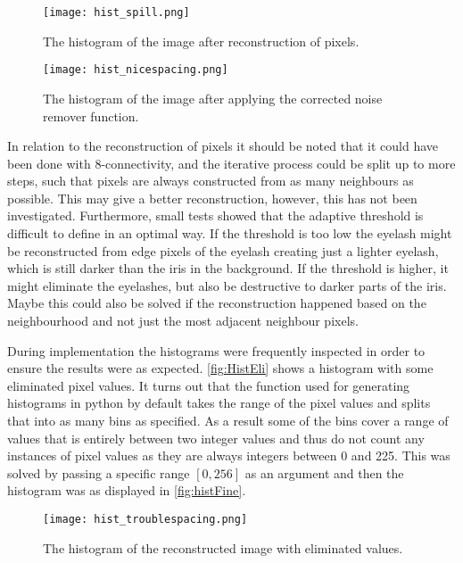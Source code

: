 \begin{figure}[H]
	\centering
	\texttt{[image: hist\_spill.png]}
	\caption{The histogram of the image after reconstruction of pixels.}
	\label{fig:histSpill}
\end{figure}



\begin{figure}[H]
	\centering
	\texttt{[image: hist\_nicespacing.png]}
	\caption{The histogram of the image after applying the corrected noise remover function.}
	\label{fig:histFine}
\end{figure}

In relation to the reconstruction of pixels it should be noted that it could have been done with 8-connectivity, and the iterative process could be split up to more steps, such that pixels are always constructed from as many neighbours as possible. This may give a better reconstruction, however, this has not been investigated. 
Furthermore, small tests showed that the adaptive threshold is difficult to define in an optimal way. If the threshold is too low the eyelash might be reconstructed from edge pixels of the eyelash creating just a lighter eyelash, which is still darker than the iris in the background. If the threshold is higher, it might eliminate the eyelashes, but also be destructive to darker parts of the iris. Maybe this could also be solved if the reconstruction happened based on the neighbourhood and not just the most adjacent neighbour pixels.
 
During implementation the histograms were frequently inspected in order to ensure the results were as expected. \autoref{fig:HistEli} shows a histogram with some eliminated pixel values. It turns out that the function used for generating histograms in python by default takes the range of the pixel values and splits that into as many bins as specified. As a result some of the bins cover a range of values that is entirely between two integer values and thus do not count any instances of pixel values as they are always integers between 0 and 225. This was solved by passing a specific range $[0,256]$ as an argument and then the histogram was as displayed in \autoref{fig:histFine}.

\begin{figure}[H]
	\centering
	\texttt{[image: hist\_troublespacing.png]}
	\caption{The histogram of the reconstructed image with eliminated values.}
	\label{fig:HistEli}
\end{figure} 

